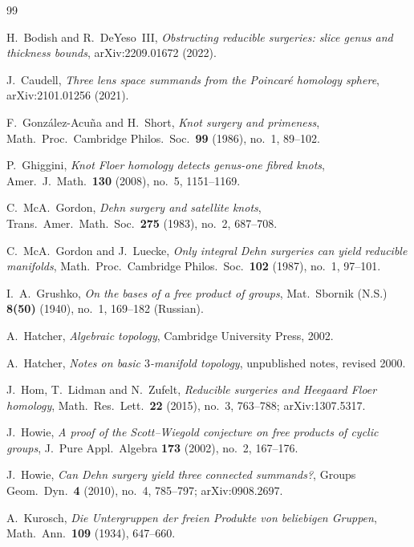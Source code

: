 \documentclass[11pt]{article}
\theoremstyle{definition}
\theoremstyle{remark}
\begin{document}
\begin{thebibliography}{99}

H.~Bodish and R.~DeYeso~III,
\emph{Obstructing reducible surgeries: slice genus and thickness bounds},
arXiv:2209.01672 (2022).

J.~Caudell,
\emph{Three lens space summands from the Poincar\'e homology sphere},
arXiv:2101.01256 (2021).

F.~Gonz\'alez-Acu\~na and H.~Short,
\emph{Knot surgery and primeness},
Math.\ Proc.\ Cambridge Philos.\ Soc.\ \textbf{99} (1986), no.~1, 89--102.

P.~Ghiggini,
\emph{Knot Floer homology detects genus-one fibred knots},
Amer.\ J.\ Math.\ \textbf{130} (2008), no.~5, 1151--1169.

C.~McA.~Gordon,
\emph{Dehn surgery and satellite knots},
Trans.\ Amer.\ Math.\ Soc.\ \textbf{275} (1983), no.~2, 687--708.

C.~McA.~Gordon and J.~Luecke,
\emph{Only integral Dehn surgeries can yield reducible manifolds},
Math.\ Proc.\ Cambridge Philos.\ Soc.\ \textbf{102} (1987), no.~1, 97--101.

I.~A.~Grushko,
\emph{On the bases of a free product of groups},
Mat.\ Sbornik (N.S.) \textbf{8(50)} (1940), no.~1, 169--182 (Russian).

A.~Hatcher,
\emph{Algebraic topology},
Cambridge University Press, 2002.

A.~Hatcher,
\emph{Notes on basic \(3\)-manifold topology},
unpublished notes, revised 2000.

J.~Hom, T.~Lidman and N.~Zufelt,
\emph{Reducible surgeries and Heegaard Floer homology},
Math.\ Res.\ Lett.\ \textbf{22} (2015), no.~3, 763--788; arXiv:1307.5317.

J.~Howie,
\emph{A proof of the Scott--Wiegold conjecture on free products of
cyclic groups},
J.\ Pure Appl.\ Algebra \textbf{173} (2002), no.~2, 167--176.

J.~Howie,
\emph{Can Dehn surgery yield three connected summands?},
Groups Geom.\ Dyn.\ \textbf{4} (2010), no.~4, 785--797; arXiv:0908.2697.

A.~Kurosch,
\emph{Die Untergruppen der freien Produkte von beliebigen Gruppen},
Math.\ Ann.\ \textbf{109} (1934), 647--660.


\end{thebibliography}
\end{document}
